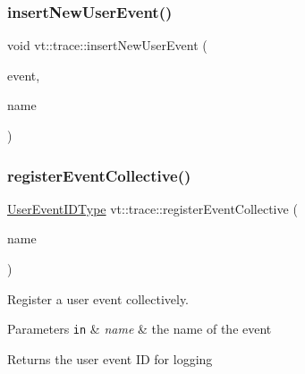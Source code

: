\mbox{\label{namespacevt_1_1trace_acbaabde4144cf5291fcc65983e7dc7a0}} 
\subsubsection{\texorpdfstring{insert\+New\+User\+Event()}{insertNewUserEvent()}}
{\footnotesize\ttfamily void vt\+::trace\+::insert\+New\+User\+Event (\begin{DoxyParamCaption}\item[{\hyperlink{namespacevt_1_1trace_a5908920d051c144c89f17c69ed262350}{User\+Event\+I\+D\+Type}}]{event,  }\item[{std\+::string const \&}]{name }\end{DoxyParamCaption})}

\mbox{\label{namespacevt_1_1trace_ab52bad26cd57cc6e59953c814192b0f1}} 
\subsubsection{\texorpdfstring{register\+Event\+Collective()}{registerEventCollective()}}
{\footnotesize\ttfamily \hyperlink{namespacevt_1_1trace_a5908920d051c144c89f17c69ed262350}{User\+Event\+I\+D\+Type} vt\+::trace\+::register\+Event\+Collective (\begin{DoxyParamCaption}\item[{std\+::string const \&}]{name }\end{DoxyParamCaption})}



Register a user event collectively. 


\begin{DoxyParams}[1]{Parameters}
\mbox{\tt in}  & {\em name} & the name of the event\\
\hline
\end{DoxyParams}
\begin{DoxyReturn}{Returns}
the user event ID for logging 
\end{DoxyReturn}
\mbox{\label{namespacevt_1_1trace_ad1f604656798749839b36d1d29def59e}} 
